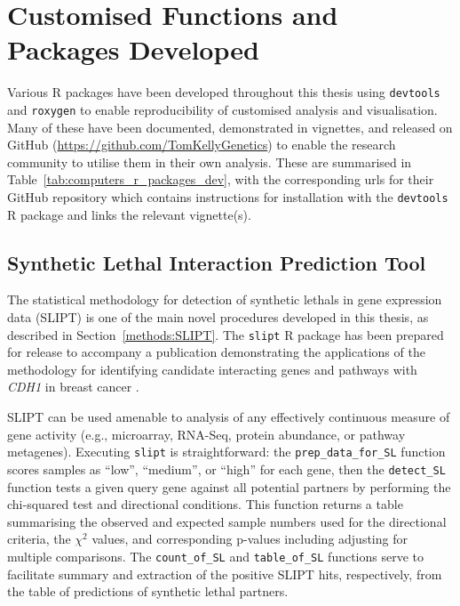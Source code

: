 \fi	

\FloatBarrier

\section{Customised Functions and Packages Developed} \label{methods:r_packages}

Various R packages \citep{R_core} have been developed throughout this thesis using \texttt{devtools} \citep{devtools} and \texttt{roxygen} \citep{roxygen} to enable reproducibility of customised analysis and visualisation. Many of these have been documented, demonstrated in vignettes, and released on GitHub (\url{https://github.com/TomKellyGenetics})
to enable the research community to utilise them in their own analysis.
These are summarised in Table~\ref{tab:computers_r_packages_dev}, with the corresponding urls for their GitHub repository which contains instructions for installation with the \texttt{devtools} R package \citep{devtools} and links the relevant vignette(s).

\subsection{Synthetic Lethal Interaction Prediction Tool}
The statistical methodology for detection of \glspl{synthetic lethal} in \gls{gene expression} data (\gls{SLIPT}) is one of the main novel procedures developed in this thesis, as described in Section~\ref{methods:SLIPT}. The \texttt{slipt} R package has been prepared for release %
to accompany a publication demonstrating the applications of the methodology for identifying candidate interacting genes and pathways with \textit{CDH1} in breast cancer \citep{TCGA2012}.

\gls{SLIPT} can be used amenable to analysis of any effectively continuous measure of gene activity (e.g., \gls{microarray}, \gls{RNA-Seq}, protein abundance, or pathway \glspl{metagene}). Executing \texttt{slipt} is straightforward: the \texttt{prep\_data\_for\_SL} function scores samples as ``low'', ``medium'', or ``high'' for each gene, then the \texttt{detect\_SL} function tests a given query gene against all potential partners by performing the chi-squared test and directional conditions. This function returns a table summarising the observed and expected sample numbers used for the directional criteria, the $\chi^2$ values, and corresponding p-values including adjusting for multiple comparisons. The \texttt{count\_of\_SL} and \texttt{table\_of\_SL} functions serve to facilitate summary and extraction of the positive \gls{SLIPT} hits, respectively, from the table of predictions of \gls{synthetic lethal} partners.

